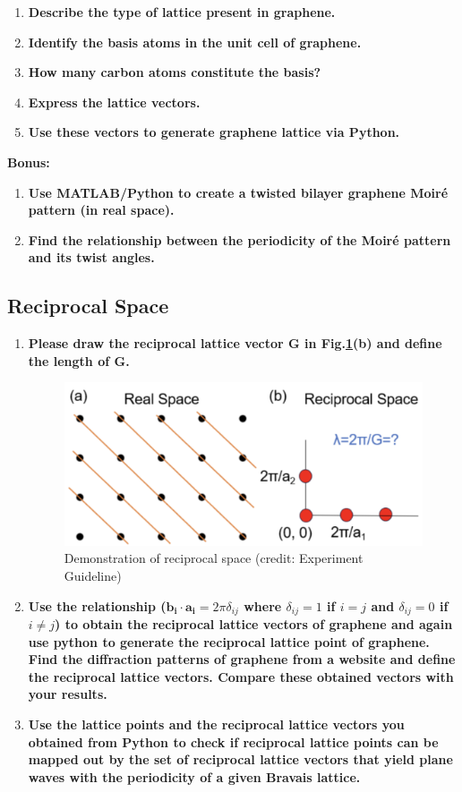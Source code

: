 \documentclass[12pt,a4paper]{article}
\begin{document}
\begin{CJK}{UTF8}{bkai}
\begin{enumerate}
    \item \textbf{Describe the type of lattice present in graphene.}
    \item \textbf{Identify the basis atoms in the unit cell of graphene.}
    \item \textbf{How many carbon atoms constitute the basis?}
    \item \textbf{Express the lattice vectors.}
    \item \textbf{Use these vectors to generate graphene lattice via Python.}
\end{enumerate}
\textbf{Bonus:}
\begin{enumerate}
    \item \textbf{Use MATLAB/Python to create a twisted bilayer graphene Moiré pattern (in real space).}
    \item \textbf{Find the relationship between the periodicity of the Moiré pattern and its twist angles.}
\end{enumerate}

\subsection{Reciprocal Space}

\begin{enumerate}
    \item \textbf{Please draw the reciprocal lattice vector G in Fig.\ref{fig:demon_reciprocal}(b) and define the length of G.}
    \begin{figure}[h]
        \centering
        \includegraphics[width=0.5\linewidth]{figures/reciprocal.png}
        \caption{Demonstration of reciprocal space (credit: Experiment Guideline)}
        \label{fig:demon_reciprocal}
    \end{figure}
    \item \textbf{Use the relationship ($\mathbf{b_i \cdot a_i} =2\pi \delta_{ij}$ where $\delta_{ij}=1$ if $i=j$ and $\delta_{ij}=0$ if $i\neq j$) to obtain the reciprocal lattice vectors of graphene and again use python to generate the reciprocal lattice point of graphene. Find the diffraction patterns of graphene from a website and define the reciprocal lattice vectors. Compare these obtained vectors with your results.}
    \item \textbf{Use the lattice points and the reciprocal lattice vectors you obtained from Python to check if reciprocal lattice points can be mapped out by the set of reciprocal lattice vectors that yield plane waves with the periodicity of a given Bravais lattice.}
\end{enumerate}


\end{CJK}
\end{document}
